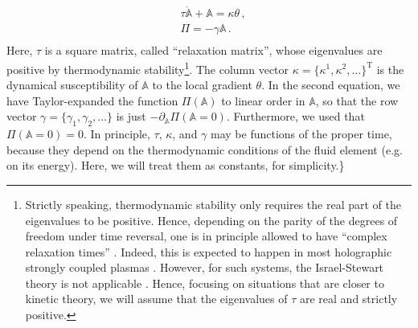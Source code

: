 \documentclass[a4paper, amsfonts, amssymb, amsmath, reprint, showkeys, nofootinbib, twoside, onecolumn,notitlepage]{revtex4-2}
\begin{document}
\begin{equation}\label{SuperModel}
\begin{split}
& \tau \dot{\mathbb{A}}+\mathbb{A}=\kappa \theta \, , \\
& \Pi= -\gamma \mathbb{A} \, . \\
\end{split}
\end{equation}
Here, $\tau$ is a square matrix, called ``relaxation matrix'', whose eigenvalues are positive by thermodynamic stability\footnote{Strictly speaking, thermodynamic stability only requires the real part of the eigenvalues to be positive. Hence, depending on the parity of the degrees of freedom under time reversal, one is in principle allowed to have ``complex relaxation times'' \cite{GavassinoNonHydro2022}. Indeed, this is expected to happen in most holographic strongly coupled plasmas \cite{Heller2014}. However, for such systems, the Israel-Stewart theory is not applicable \cite{Denicol_Relaxation_2011}. Hence, focusing on situations that are closer to kinetic theory, we will assume that the eigenvalues of $\tau$ are real and strictly positive.}. The column vector $\kappa=\{\kappa^1,\kappa^2,\ldots\}^\mathrm{T}$ is the dynamical susceptibility of $\mathbb{A}$ to the local gradient $\theta$. In the second equation, we have Taylor-expanded the function $\Pi(\mathbb{A})$ to linear order in $\mathbb{A}$, so that the row vector $\gamma=\{\gamma_1,\gamma_2,\ldots\}$ is just $-\partial_{\mathbb{A}}\Pi(\mathbb{A}{=}0)$. Furthermore, we used that $\Pi(\mathbb{A}{=}0)=0$. In principle, $\tau$, $\kappa$, and $\gamma$ may be functions of the proper time, because they depend on the thermodynamic conditions of the fluid element (e.g. on its energy). Here, we will treat them as constants, for simplicity.\}
\end{document}
